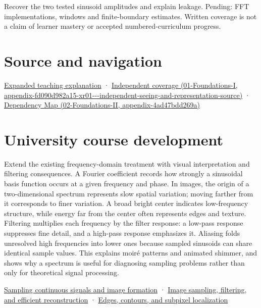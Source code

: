 Recover the two tested sinusoid amplitudes and explain leakage. Pending: FFT implementations, windows and finite-boundary estimates. Written coverage is not a claim of learner mastery or accepted numbered-curriculum progress.

\section{Source and navigation}\label{appendix-b60686ba06a1-source-and-navigation}

\href{Continuous\%20Notes/University\%20-\%20Worlds,\%20Images\%20and\%20Inference\%20-\%20Graphics,\%20Vision\%20and\%20Photography\#Fourier\%20coordinates\%20reveal\%20what\%20a\%20filter\%20removes}{Expanded teaching explanation} · \href{../01-Foundations-I/main.pdf\#nameddest=appendix-fd090d982a15-xr01---independent-seeing-and-representation-source}{Independent coverage (01-Foundations-I, appendix-fd090d982a15-xr01-\/-\/-independent-seeing-and-representation-source)} · \href{../02-Foundations-II/main.pdf\#nameddest=appendix-4ad47bdd269a}{Dependency Map (02-Foundations-II, appendix-4ad47bdd269a)}

\section{University course development}\label{appendix-b60686ba06a1-university-course-development}

Extend the existing frequency-domain treatment with visual interpretation and filtering consequences. A Fourier coefficient records how strongly a sinusoidal basis function occurs at a given frequency and phase. In images, the origin of a two-dimensional spectrum represents slow spatial variation; moving farther from it corresponds to finer variation. A broad bright center indicates low-frequency structure, while energy far from the center often represents edges and texture. Filtering multiplies each frequency by the filter response: a low-pass response suppresses fine detail, and a high-pass response emphasizes it. Aliasing folds unresolved high frequencies into lower ones because sampled sinusoids can share identical sample values. This explains moiré patterns and animated shimmer, and shows why a spectrum is useful for diagnosing sampling problems rather than only for theoretical signal processing.

\href{Continuous\%20Notes/University\%20-\%20Worlds,\%20Images\%20and\%20Inference\%20-\%20Graphics,\%20Vision\%20and\%20Photography\#Sampling\%20continuous\%20signals\%20and\%20image\%20formation}{Sampling continuous signals and image formation} · \href{Continuous\%20Notes/University\%20-\%20Worlds,\%20Images\%20and\%20Inference\%20-\%20Graphics,\%20Vision\%20and\%20Photography\#Image\%20sampling,\%20filtering,\%20and\%20efficient\%20reconstruction}{Image sampling, filtering, and efficient reconstruction} · \href{Continuous\%20Notes/University\%20-\%20Worlds,\%20Images\%20and\%20Inference\%20-\%20Graphics,\%20Vision\%20and\%20Photography\#Edges,\%20contours,\%20and\%20subpixel\%20localization}{Edges, contours, and subpixel localization}
